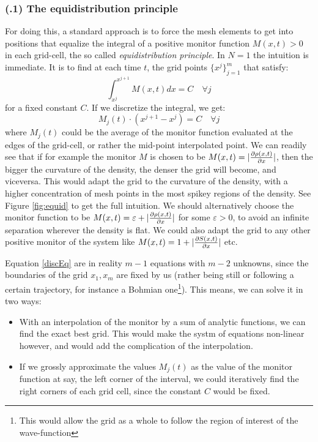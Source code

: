\documentclass[11pt, a4paper]{article} %
\begin{document}
\subsubsection*{(\textgamma.1) The equidistribution principle}
For doing this, a standard approach is to force the mesh elements to get into positions that equalize the integral of a positive monitor function $M(x,t)>0$ in each grid-cell, the so called {\em equidistribution principle}. In $N=1$ the intuition is immediate. It is to find at each time $t$, the grid points $\{x^j\}_{j=1}^m$ that satisfy:
\begin{equation}
\int^{x^{j+1}}_{x^j} M(x,t) dx =C \quad \forall j
\end{equation}
for a fixed constant $C$. If we discretize the integral, we get:
\begin{equation}\label{discEq}
M_j(t)\cdot (x^{j+1}-x^j)=C \quad \forall j
\end{equation}
where $M_j(t)$ could be the average of the monitor function evaluated at the edges of the grid-cell, or rather the mid-point interpolated point. We can readily see that if for example the monitor $M$ is chosen to be $M(x,t)=|\pdv{\rho(x,t)}{x}|$, then the bigger the curvature of the density, the denser the grid will become, and viceversa. This would adapt the grid to the curvature of the density, with a higher concentration of mesh points in the most spikey regions of the density. See Figure \ref{fig:equid} to get the full intuition. We should alternatively choose the monitor function to be $M(x,t)=\varepsilon+|\pdv{\rho(x,t)}{x}|$ for some $\varepsilon>0$, to avoid an infinite separation wherever the density is flat. We could also adapt the grid to any other positive monitor of the system like $M(x,t)=1+|\pdv{S(x,t)}{x}|$ etc.

Equation \eqref{discEq} are in reality $m-1$ equations with $m-2$ unknowns, since the boundaries of the grid $x_1, x_m$ are fixed by us (rather being still or following a certain trajectory, for instance a Bohmian one\footnote{This would allow the grid as a whole to follow the region of interest of the wave-function}). This means, we can solve it in two ways: 
\begin{itemize}
\item With an interpolation of the monitor by a sum of analytic functions, we can find the exact best grid. This would make the systm of equations non-linear however, and would add the complication of the interpolation.

\item If we grossly approximate the values $M_j(t)$ as the value of the monitor function at say, the left corner of the interval, we could iteratively find the right corners of each grid cell, since the constant $C$ would be fixed.
\end{itemize}
\end{document}
